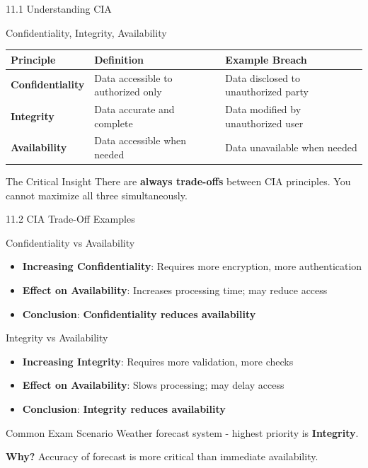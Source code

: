 \documentclass{beamer}
\begin{document}
	\begin{frame}{11.1 Understanding CIA}
		\begin{block}{Confidentiality, Integrity, Availability}
			\begin{tabular}{|p{2.5cm}|p{4cm}|p{4.5cm}|}
				\hline
				\textbf{Principle} & \textbf{Definition} & \textbf{Example Breach} \\
				\hline
				\textbf{Confidentiality} & Data accessible to authorized only & Data disclosed to unauthorized party \\
				\hline
				\textbf{Integrity} & Data accurate and complete & Data modified by unauthorized user \\
				\hline
				\textbf{Availability} & Data accessible when needed & Data unavailable when needed \\
				\hline
			\end{tabular}
		\end{block}
		
		\begin{alertblock}{The Critical Insight}
			There are \textbf{always trade-offs} between CIA principles. You cannot maximize all three simultaneously.
		\end{alertblock}
	\end{frame}
	
	\begin{frame}{11.2 CIA Trade-Off Examples}
		\begin{block}{Confidentiality vs Availability}
			\begin{itemize}
				\item \textbf{Increasing Confidentiality}: Requires more encryption, more authentication
				\item \textbf{Effect on Availability}: Increases processing time; may reduce access
				\item \textbf{Conclusion}: \textbf{Confidentiality reduces availability}
			\end{itemize}
		\end{block}
		
		\begin{block}{Integrity vs Availability}
			\begin{itemize}
				\item \textbf{Increasing Integrity}: Requires more validation, more checks
				\item \textbf{Effect on Availability}: Slows processing; may delay access
				\item \textbf{Conclusion}: \textbf{Integrity reduces availability}
			\end{itemize}
		\end{block}
		
		\begin{exampleblock}{Common Exam Scenario}
			Weather forecast system - highest priority is \textbf{Integrity}.
			
			\textbf{Why?} Accuracy of forecast is more critical than immediate availability.
		\end{exampleblock}
	\end{frame}
	
\end{document}
